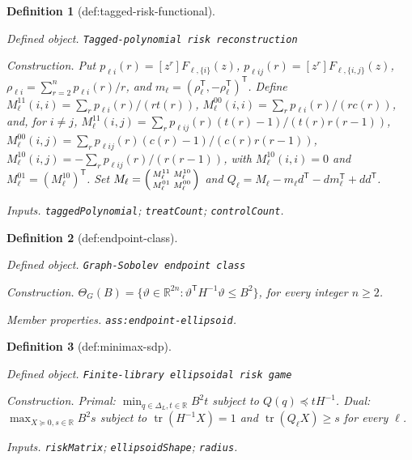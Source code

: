 \documentclass{article}
\newtheorem{definition}{Definition}
\begin{document}
\begin{definition}[def:tagged-risk-functional]\label{def:tagged-risk-functional}
\par\smallskip\noindent\emph{Defined object.} \texttt{Tagged-\allowbreak{}polynomial risk reconstruction}
\par\smallskip\noindent\emph{Construction.} Put \(p_{\ell i}(r)=[z^r]F_{\ell,\{i\}}(z)\), \(p_{\ell ij}(r)=[z^r]F_{\ell,\{i,j\}}(z)\), \(\rho_{\ell i}=\sum_{r=2}^np_{\ell i}(r)/r\), and \(m_{\ell}=(\rho_{\ell}^{\mathsf T},-\rho_{\ell}^{\mathsf T})^{\mathsf T}\). Define \(M_{\ell}^{11}(i,i)=\sum_rp_{\ell i}(r)/(r t(r))\), \(M_{\ell}^{00}(i,i)=\sum_rp_{\ell i}(r)/(r c(r))\), and, for \(i\ne j\), \(M_{\ell}^{11}(i,j)=\sum_rp_{\ell ij}(r)(t(r)-1)/(t(r)r(r-1))\), \(M_{\ell}^{00}(i,j)=\sum_rp_{\ell ij}(r)(c(r)-1)/(c(r)r(r-1))\), \(M_{\ell}^{10}(i,j)=-\sum_rp_{\ell ij}(r)/(r(r-1))\), with \(M_{\ell}^{10}(i,i)=0\) and \(M_{\ell}^{01}=(M_{\ell}^{10})^{\mathsf T}\). Set \(M_{\ell}=\begin{psmallmatrix}M_{\ell}^{11}&M_{\ell}^{10}\\M_{\ell}^{01}&M_{\ell}^{00}\end{psmallmatrix}\) and \(Q_{\ell}=M_{\ell}-m_{\ell}d^{\mathsf T}-dm_{\ell}^{\mathsf T}+dd^{\mathsf T}\).
\par\smallskip\noindent\emph{Inputs.} \texttt{taggedPolynomial}; \texttt{treatCount}; \texttt{controlCount}.
\end{definition}

\begin{definition}[def:endpoint-class]\label{def:endpoint-class}
\par\smallskip\noindent\emph{Defined object.} \texttt{Graph-\allowbreak{}Sobolev endpoint class}
\par\smallskip\noindent\emph{Construction.} \(\Theta_G(B)=\{\vartheta\in\mathbb R^{2n}:\vartheta^{\mathsf T}H^{-1}\vartheta\le B^2\}\), for every integer \(n\ge2\).
\par\smallskip\noindent\emph{Member properties.} \texttt{ass:\allowbreak{}endpoint-\allowbreak{}ellipsoid}.
\end{definition}

\begin{definition}[def:minimax-sdp]\label{def:minimax-sdp}
\par\smallskip\noindent\emph{Defined object.} \texttt{Finite-\allowbreak{}library ellipsoidal risk game}
\par\smallskip\noindent\emph{Construction.} Primal: \(\min_{q\in\Delta_L,t\in\mathbb R}B^2t\) subject to \(Q(q)\preceq tH^{-1}\). Dual: \(\max_{X\succeq0,s\in\mathbb R}B^2s\) subject to \(\operatorname{tr}(H^{-1}X)=1\) and \(\operatorname{tr}(Q_{\ell}X)\ge s\) for every \(\ell\).
\par\smallskip\noindent\emph{Inputs.} \texttt{riskMatrix}; \texttt{ellipsoidShape}; \texttt{radius}.
\end{definition}
\end{document}
